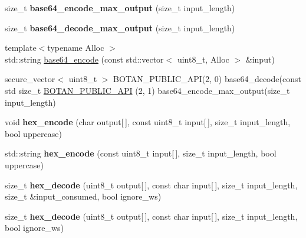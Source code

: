 \begin{DoxyCompactItemize}
\item 
\mbox{\label{namespace_botan_a9f58590365a92ccd97fac90b7d1fe53c}} 
size\+\_\+t {\bfseries base64\+\_\+encode\+\_\+max\+\_\+output} (size\+\_\+t input\+\_\+length)
\item 
\mbox{\label{namespace_botan_aac87499eb132d9d0c6231099e83b8c5b}} 
size\+\_\+t {\bfseries base64\+\_\+decode\+\_\+max\+\_\+output} (size\+\_\+t input\+\_\+length)
\item 
{\footnotesize template$<$typename Alloc $>$ }\\std\+::string \mbox{\hyperlink{namespace_botan_ae612d0f1287d36555adbe7ed4d8f171f}{base64\+\_\+encode}} (const std\+::vector$<$ uint8\+\_\+t, Alloc $>$ \&input)
\item 
secure\+\_\+vector$<$ uint8\+\_\+t $>$ B\+O\+T\+A\+N\+\_\+\+P\+U\+B\+L\+I\+C\+\_\+\+A\+PI(2, 0) base64\+\_\+decode(const std size\+\_\+t \mbox{\hyperlink{namespace_botan_a835833515e6080a0d56a13ff99ef4958}{B\+O\+T\+A\+N\+\_\+\+P\+U\+B\+L\+I\+C\+\_\+\+A\+PI}} (2, 1) base64\+\_\+encode\+\_\+max\+\_\+output(size\+\_\+t input\+\_\+length)
\item 
\mbox{\label{namespace_botan_aa010aeebafe9ae6ba3134760b3fe3236}} 
void {\bfseries hex\+\_\+encode} (char output\mbox{[}$\,$\mbox{]}, const uint8\+\_\+t input\mbox{[}$\,$\mbox{]}, size\+\_\+t input\+\_\+length, bool uppercase)
\item 
\mbox{\label{namespace_botan_a1855c262ee9f7be53e49811ac94c4f20}} 
std\+::string {\bfseries hex\+\_\+encode} (const uint8\+\_\+t input\mbox{[}$\,$\mbox{]}, size\+\_\+t input\+\_\+length, bool uppercase)
\item 
\mbox{\label{namespace_botan_ab93c5a46ff7edd2c3803b3d43c677131}} 
size\+\_\+t {\bfseries hex\+\_\+decode} (uint8\+\_\+t output\mbox{[}$\,$\mbox{]}, const char input\mbox{[}$\,$\mbox{]}, size\+\_\+t input\+\_\+length, size\+\_\+t \&input\+\_\+consumed, bool ignore\+\_\+ws)
\item 
\mbox{\label{namespace_botan_aa937b612b7607a0bb4407a93633c4f7e}} 
size\+\_\+t {\bfseries hex\+\_\+decode} (uint8\+\_\+t output\mbox{[}$\,$\mbox{]}, const char input\mbox{[}$\,$\mbox{]}, size\+\_\+t input\+\_\+length, bool ignore\+\_\+ws)

\end{DoxyCompactItemize}
